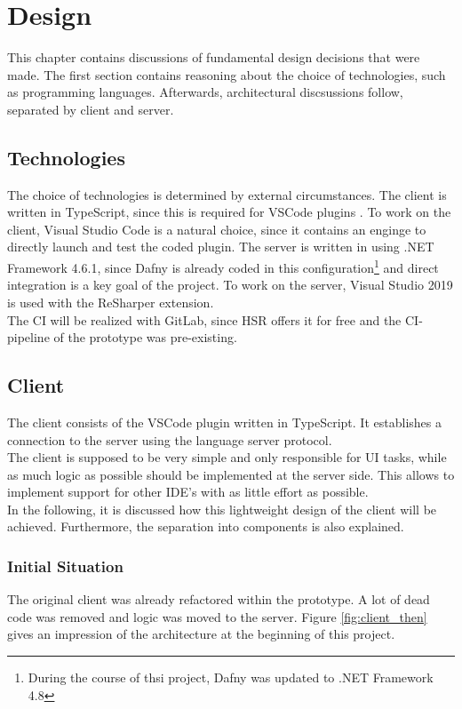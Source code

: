 \section{Design}
This chapter contains discussions of fundamental design decisions that were made.
The first section contains reasoning about the choice of technologies, such as programming languages.
Afterwards, architectural discsussions follow, separated by client and server.

\subsection{Technologies}
The choice of technologies is determined by external circumstances.
The client is written in TypeScript, since this is required for VSCode plugins \cite{vscodeAPI}.
To work on the client, Visual Studio Code is a natural choice, since it contains an enginge to directly launch and test the coded plugin.
The server is written in \CsharpWithSpace using .NET Framework 4.6.1, since Dafny is already coded in this
configuration\footnote{During the course of thsi project, Dafny was updated to .NET Framework 4.8} and direct integration is a key goal of the project.
To work on the server, Visual Studio 2019 is used with the ReSharper extension.\\
The CI will be realized with GitLab, since HSR offers it for free and the CI-pipeline of the prototype was pre-existing.

\subsection{Client}
The client consists of the VSCode plugin written in TypeScript.
It establishes a connection to the server using the language server protocol.\\

The client is supposed to be very simple and only responsible for UI tasks, while as much logic as possible should be implemented at the server side.
This allows to implement support for other IDE's with as little effort as possible.\\

In the following, it is discussed how this lightweight design of the client will be achieved.
Furthermore, the separation into components is also explained.

\subsubsection{Initial Situation}
The original client was already refactored within the prototype.
A lot of dead code was removed and logic was moved to the server.
Figure \ref{fig:client_then} gives an impression of the architecture at the beginning of this project.

